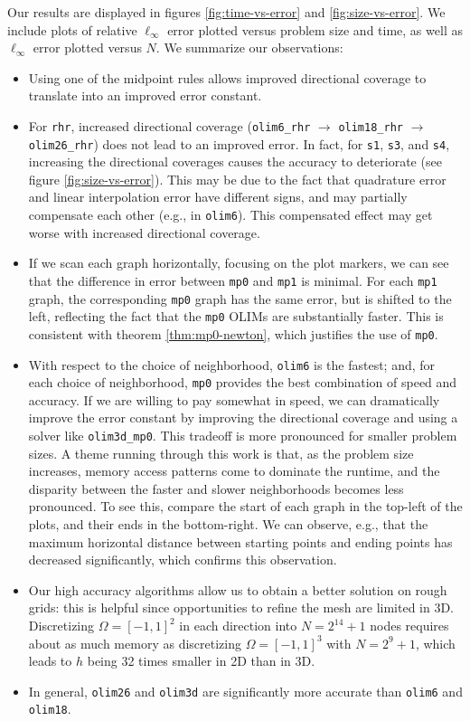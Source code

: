 \documentclass[smallcondensed]{svjour3}
\begin{document}
Our results are displayed in figures \ref{fig:time-vs-error} and
\ref{fig:size-vs-error}. We include plots of relative $\ell_\infty$
error plotted versus problem size and time, as well as $\ell_\infty$
error plotted versus $N$. We summarize our observations:
\begin{itemize}
\item Using one of the midpoint rules allows improved directional
  coverage to translate into an improved error constant.
\item For \texttt{rhr}, increased directional coverage
  (\texttt{olim6\_rhr} $\to$ \texttt{olim18\_rhr} $\to$
  \texttt{olim26\_rhr}) does not lead to an improved error. In fact,
  for \texttt{s1}, \texttt{s3}, and \texttt{s4}, increasing the
  directional coverages causes the accuracy to deteriorate (see figure
  \ref{fig:size-vs-error}). This may be due to the fact that
  quadrature error and linear interpolation error have different
  signs, and may partially compensate each other (e.g., in
  \texttt{olim6}). This compensated effect may get worse with
  increased directional coverage.
\item If we scan each graph horizontally, focusing on the plot
  markers, we can see that the difference in error between
  \texttt{mp0} and \texttt{mp1} is minimal. For each \texttt{mp1}
  graph, the corresponding \texttt{mp0} graph has the same error, but
  is shifted to the left, reflecting the fact that the \texttt{mp0}
  OLIMs are substantially faster. This is consistent with theorem
  \ref{thm:mp0-newton}, which justifies the use of \texttt{mp0}.
\item With respect to the choice of neighborhood, \texttt{olim6} is
  the fastest; and, for each choice of neighborhood, \texttt{mp0}
  provides the best combination of speed and accuracy. If we are
  willing to pay somewhat in speed, we can dramatically improve the
  error constant by improving the directional coverage and using a
  solver like \texttt{olim3d\_mp0}. This tradeoff is more pronounced
  for smaller problem sizes. A theme running through this work is
  that, as the problem size increases, memory access patterns come to
  dominate the runtime, and the disparity between the faster and
  slower neighborhoods becomes less pronounced. To see this, compare
  the start of each graph in the top-left of the plots, and their ends
  in the bottom-right. We can observe, e.g., that the maximum
  horizontal distance between starting points and ending points has
  decreased significantly, which confirms this observation.
\item Our high accuracy algorithms allow us to obtain a better
  solution on rough grids: this is helpful since opportunities to
  refine the mesh are limited in 3D. Discretizing $\Omega = [-1, 1]^2$
  in each direction into $N = 2^{14} + 1$ nodes requires about as much
  memory as discretizing $\Omega = [-1, 1]^3$ with $N = 2^{9} + 1$,
  which leads to $h$ being 32 times smaller in 2D than in 3D.
\item In general, \texttt{olim26} and \texttt{olim3d} are
  significantly more accurate than \texttt{olim6} and \texttt{olim18}.
\end{itemize}
\end{document}
